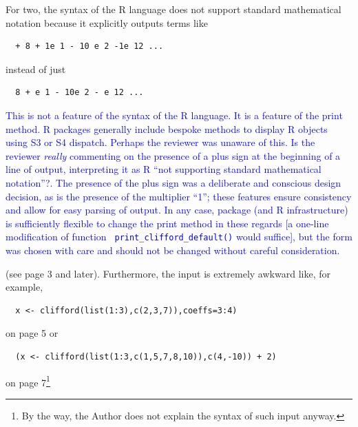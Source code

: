 \documentclass{article}
\begin{document}
\begin{itemize}
For two, the syntax of the R language does not support standard
mathematical notation because it explicitly outputs terms like

\begin{verbatim}
  + 8 + 1e 1 - 10 e 2 -1e 12 ...
\end{verbatim}

instead of just

\begin{verbatim}
  8 + e 1 - 10e 2 - e 12 ...
\end{verbatim}

\textcolor{blue}{This is not a feature of the syntax of the R
  language.  It is a feature of the print method.  R packages
  generally include bespoke methods to display R objects using S3 or
  S4 dispatch.  Perhaps the reviewer was unaware of this.  Is the
  reviewer {\em really} commenting on the presence of a plus sign at
  the beginning of a line of output, interpreting it as R ``not
  supporting standard mathematical notation''?.  The presence of the
  plus sign was a deliberate and conscious design decision, as is the
  presence of the multiplier ``1''; these features ensure consistency
  and allow for easy parsing of output.  In any case, package (and R
  infrastructure) is sufficiently flexible to change the print method
  in these regards [a one-line modification of function {\tt
      print\_clifford\_default()} would suffice], but the form was
  chosen with care and should not be changed without careful consideration.}

(see page 3 and later). Furthermore, the input is extremely awkward
like, for example,

\begin{verbatim}
  x <- clifford(list(1:3),c(2,3,7)),coeffs=3:4)
\end{verbatim}

on page 5 or

\begin{verbatim}
  (x <- clifford(list(1:3,c(1,5,7,8,10)),c(4,-10)) + 2)
\end{verbatim}

 on
page 7\footnote{By the way, the Author does not explain the syntax of
such input anyway.}


\end{itemize}
\end{document}
